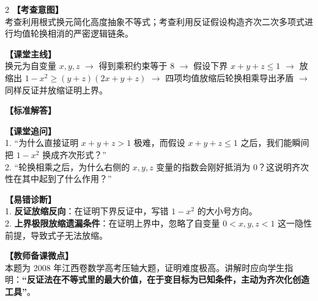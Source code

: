 \documentclass[12pt,a4paper]{ctexart}
\begin{document}
\begin{paracol}{2}
  \textbf{【考查意图】}\\
  考查利用根式换元简化高度抽象不等式；考查利用反证假设构造齐次二次多项式进行均值轮换相消的严密逻辑链条。
  
  \textbf{【课堂主线】}\\
  换元为自变量 \(x,y,z\) \(\to\) 得到乘积约束等于 8 \(\to\) 假设下界 \(x+y+z \leqslant 1\) \(\to\) 放缩出 \(1-x^2 \geqslant (y+z)(2x+y+z)\) \(\to\) 四项均值放缩后轮换相乘导出矛盾 \(\to\) 同样反证并放缩证明上界。
  
  \textbf{【标准解答】}\\
  \qFiveSolution
  
  \textbf{【课堂追问】}\\
  1. “为什么直接证明 \(x+y+z>1\) 极难，而假设 \(x+y+z \leqslant 1\) 之后，我们能瞬间把 \(1-x^2\) 换成齐次形式？”\\
  2. “轮换相乘之后，为什么右侧的 \(x, y, z\) 变量的指数会刚好抵消为 0？这说明齐次性在其中起到了什么作用？”
  
  \switchcolumn
  \textbf{【易错诊断】}\\
  1. \textbf{反证放缩反向}：在证明下界反证中，写错 \(1-x^2\) 的大小号方向。\\
  2. \textbf{上界极限放缩遗漏条件}：在证明上界中，忽略了自变量 \(0 < x, y, z < 1\) 这一隐性前提，导致式子无法放缩。
  
  \textbf{【教师备课微点】}\\
  本题为 2008 年江西卷数学高考压轴大题，证明难度极高。讲解时应向学生指明：\textbf{“反证法在不等式里的最大价值，在于变目标为已知条件，主动为齐次化创造工具”}。
\end{paracol}

\vspace{0.8em}
\par{}
\vspace{0.8em}

{\small
\qSixStem
}
\end{document}
